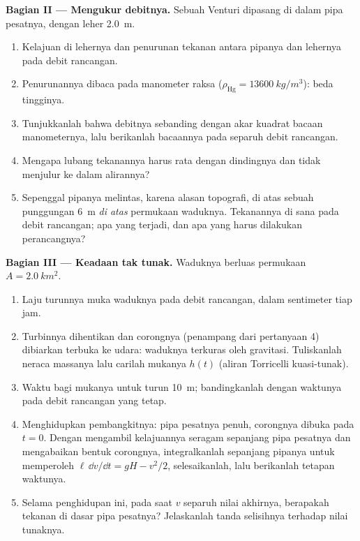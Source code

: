\begin{problem}
\medskip
\noindent\textbf{Bagian II --- Mengukur debitnya.}
Sebuah Venturi dipasang di dalam pipa pesatnya, dengan leher \qty{2.0}{m}.
\begin{enumerate}[resume]
  \item Kelajuan di lehernya dan penurunan tekanan antara pipanya dan
        lehernya pada debit rancangan.
  \item Penurunannya dibaca pada manometer raksa ($\rho_{\text{Hg}} =
        \qty{13600}{kg/m^3}$): beda tingginya.
  \item Tunjukkanlah bahwa debitnya sebanding dengan akar kuadrat
        bacaan manometernya, lalu berikanlah bacaannya pada separuh
        debit rancangan.
  \item Mengapa lubang tekanannya harus rata dengan dindingnya dan tidak
        menjulur ke dalam alirannya?
  \item Sepenggal pipanya melintas, karena alasan topografi, di atas
        sebuah punggungan \qty{6}{m} \emph{di atas} permukaan waduknya.
        Tekanannya di sana pada debit rancangan; apa yang terjadi, dan
        apa yang harus dilakukan perancangnya?
\end{enumerate}

\medskip
\noindent\textbf{Bagian III --- Keadaan tak tunak.}
Waduknya berluas permukaan $A = \qty{2.0}{km^2}$.
\begin{enumerate}[resume]
  \item Laju turunnya muka waduknya pada debit rancangan, dalam
        sentimeter tiap jam.
  \item Turbinnya dihentikan dan corongnya (penampang dari pertanyaan 4)
        dibiarkan terbuka ke udara: waduknya terkuras oleh gravitasi.
        Tuliskanlah neraca massanya lalu carilah mukanya $h(t)$ (aliran
        Torricelli kuasi-tunak).
  \item Waktu bagi mukanya untuk turun \qty{10}{m}; bandingkanlah dengan
        waktunya pada debit rancangan yang tetap.
  \item Menghidupkan pembangkitnya: pipa pesatnya penuh, corongnya
        dibuka pada $t = 0$. Dengan mengambil kelajuannya seragam
        sepanjang pipa pesatnya dan mengabaikan bentuk corongnya,
        integralkanlah  sepanjang pipanya untuk memperoleh
        $\ell\,\dd v/\dd t = gH - v^2/2$, selesaikanlah, lalu berikanlah
        tetapan waktunya.
  \item Selama penghidupan ini, pada saat $v$ separuh nilai akhirnya,
        berapakah tekanan di dasar pipa pesatnya? Jelaskanlah tanda
        selisihnya terhadap nilai tunaknya.
\end{enumerate}


\end{problem}
